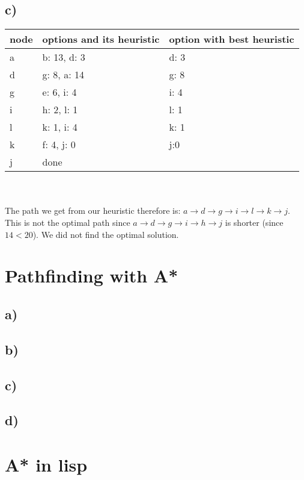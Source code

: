 \documentclass[12pt,a4paper]{scrartcl}
\begin{document}
\subsection*{c)}
	\begin{tabular}{l | l | l   }
		node & options and its heuristic & option with best heuristic \\ \hline
		a & b: 13, d: 3 & d: 3 \\
		d & g: 8, a: 14 & g: 8 \\
		g & e: 6, i: 4 & i: 4 \\
		i & h: 2, l: 1 & l: 1\\
		l & k: 1, i: 4 & k: 1 \\
		k & f: 4, j: 0 & j:0 \\
		j & done   		
	\end{tabular}\\ \\
	The path we get from our heuristic therefore is: $a \rightarrow d \rightarrow g \rightarrow i \rightarrow l \rightarrow k \rightarrow j$. \\
	This is not the optimal path since $a \rightarrow d \rightarrow g \rightarrow i \rightarrow h \rightarrow j$ is shorter (since $14 < 20$). We did not find the optimal solution.
\section{Pathfinding with A*}
\subsection*{a)}
\subsection*{b)}
\subsection*{c)}
\subsection*{d)}
\section{A* in lisp}
	
\end{document}
